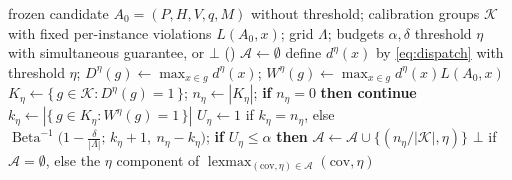 \begin{algorithm}[t]
\caption{\textsc{Calibrate} --- fixed-grid exact selective admission. The score $q$ and
the grid $\Lambda$ are frozen \emph{before} this procedure sees a calibration group, which is what
makes the union bound legitimate.}
\label{alg:calibrate}
\footnotesize
\begin{algorithmic}[1]
\Require frozen candidate $A_0=(P,H,V,q,M)$ without threshold; calibration
         groups $\mathcal{K}$ with fixed per-instance violations $L(A_0,x)$;
         grid $\Lambda$; budgets $\alpha,\delta$
\Ensure threshold $\eta$ with simultaneous guarantee, or $\bot$ (\retire)
\State $\mathcal{A}\gets\emptyset$ 
\ForAll{$\eta\in\Lambda$}
  \State define $d^\eta(x)$ by \cref{eq:dispatch} with threshold $\eta$;
         $D^\eta(g)\gets\max_{x\in g}d^\eta(x)$;
         $W^\eta(g)\gets\max_{x\in g}d^\eta(x)L(A_0,x)$
  \State $K_\eta\gets\{\,g\in\mathcal{K}:D^\eta(g)=1\,\}$;\quad
         $n_\eta\gets|K_\eta|$;\quad
         \textbf{if} $n_\eta=0$ \textbf{then continue}
  \State $k_\eta\gets|\{\,g\in K_\eta:W^\eta(g)=1\,\}|$
  \State $U_\eta\gets 1$ if $k_\eta=n_\eta$, else
         $\operatorname{Beta}^{-1}\!\big(1-\tfrac{\delta}{|\Lambda|};\,
         k_\eta+1,\ n_\eta-k_\eta\big)$;\quad
         \textbf{if} $U_\eta\le\alpha$ \textbf{then}
         $\mathcal{A}\gets\mathcal{A}\cup\{(n_\eta/|\mathcal{K}|,\eta)\}$
\EndFor
\State \Return $\bot$ if $\mathcal{A}=\emptyset$, else the $\eta$ component of
       $\operatorname*{lexmax}_{(\mathrm{cov},\eta)\in\mathcal{A}}
       (\mathrm{cov},\eta)$
\end{algorithmic}
\end{algorithm}

